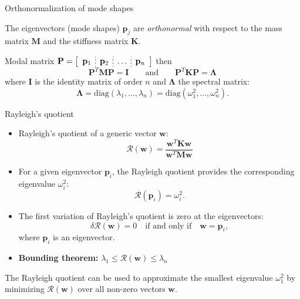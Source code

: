 \documentclass[aspectratio=169]{beamer}
\begin{document}
{  \begin{frame}{Orthonormalization of mode shapes}
    \begin{tcolorbox}[colback=darkred!10,colframe=darkred!40!black]
      The eigenvectors (mode shapes) \( \mathbf{p}_j \) are \emph{orthonormal} with respect to the mass matrix \( \mathbf{M} \) and the stiffness matrix \( \mathbf{K} \).
    \end{tcolorbox}
    \vspace{0.3cm}
    Modal matrix $\mathbf P=\left[ \begin{array}{c;{2pt/2pt}c;{2pt/2pt}c;{2pt/2pt}c}
          \mathbf p_{1} & \mathbf p_{2} & \dots & \mathbf p_{n} \\
        \end{array}\right]$
    then
    $$  \mathbf P^T\mathbf M\mathbf P  =\mathbf I       \qquad\text{and}\qquad
      \mathbf P^T\mathbf K\mathbf P  =\mathbf\Lambda$$
    where $\mathbf I$ is the identity matrix of order $n$ and $\mathbf\Lambda$ the spectral matrix:
    $$\mathbf\Lambda=\text{diag}(\lambda_1,\dots,\lambda_n)=\text{diag}(\omega_1^2,\dots,\omega_n^2).$$
  \end{frame}

  \begin{frame}{Rayleigh's quotient}
    \small
    \begin{itemize}
      \item Rayleigh's quotient of a generic vector $\mathbf w$:
            \[
              \mathcal R(\mathbf w) = \frac{\mathbf w^T \mathbf K \mathbf w}{\mathbf w^T \mathbf M \mathbf w}
            \]
      \item For a given eigenvector \( \mathbf{p}_i  \), the Rayleigh quotient provides the corresponding eigenvalue \( \omega_i^2 \):$$\mathcal R(\mathbf p_i) = \omega_i^2.$$
      \item The first variation of Rayleigh's quotient is zero at the eigenvectors:
            \[
              \delta \mathcal{R}(\mathbf{w}) = 0 \quad \text{if and only if} \quad \mathbf{w} = \mathbf{p}_i,
            \]
            where \(\mathbf{p}_i\) is an eigenvector.
      \item \textbf{Bounding theorem:}
            \vspace{0.2cm}
            \(
            \lambda_1 \leq \mathcal{R}(\mathbf{w}) \leq \lambda_n
            \)
    \end{itemize}
    \begin{tcolorbox}[colback=darkred!10,colframe=darkred!40!black]
      The Rayleigh quotient can be used to approximate the smallest eigenvalue \( \omega_1^2 \) by minimizing \( \mathcal R(\mathbf w) \) over all non-zero vectors \( \mathbf w \).
    \end{tcolorbox}
  \end{frame}

}
\end{document}
